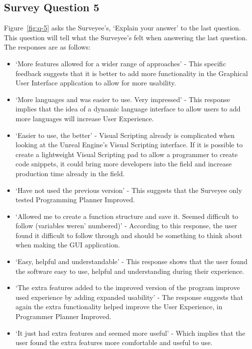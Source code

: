 \documentclass[12pt]{report} %
\begin{document}
				\subsection{Survey Question 5}
					Figure~\ref{fig:q-5} asks the Surveyee's, `Explain your answer' to the last question. This question will tell what the Surveyee's felt when answering the last question. The responses are as follows:
					\begin{itemize}
					  \item `More features allowed for a wider range of approaches' - This specific feedback suggests that it is better to add more functionality in the Graphical User Interface application to allow for more usability.
					  \item `More languages and was easier to use. Very impressed' - This response implies that the idea of a dynamic language interface to allow users to add more languages will increase User Experience.
					  \item `Easier to use, the better' - Visual Scripting already is complicated when looking at the Unreal Engine's Visual Scripting interface. If it is possible to create a lightweight Visual Scripting pad to allow a programmer to create code snippets, it could bring more developers into the field and increase production time already in the field.
					  \item `Have not used the previous version' - This suggests that the Surveyee only tested Programming Planner Improved.
					  \item `Allowed me to create a function structure and save it. Seemed difficult to follow (variables weren' numbered)' - According to this response, the user found it difficult to follow through and should be something to think about when making the GUI application.
					  \item `Easy, helpful and understandable' - This response shows that the user found the software easy to use, helpful and understanding during their experience.
					  \item `The extra features added to the improved version of the program improve used experience by adding expanded usability' - The response suggests that again the extra functionality helped improve the User Experience, in Programmer Planner Improved.
					  \item `It just had extra features and seemed more useful' - Which implies that the user found the extra features more comfortable and useful to use.
					\end{itemize}
			
\end{document}
